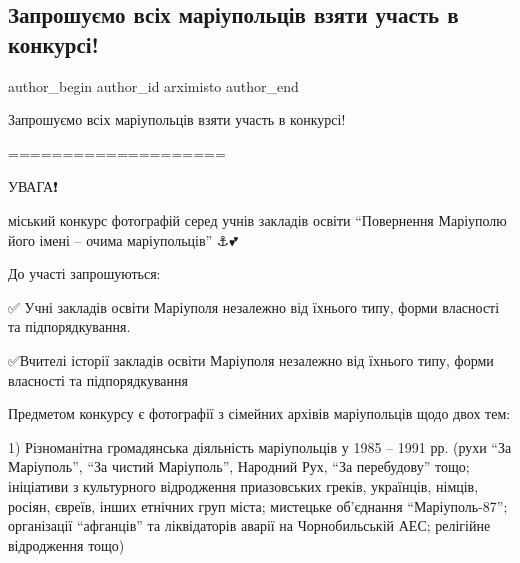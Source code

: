  
 
 
 
 

\subsection{Запрошуємо всіх маріупольців взяти участь в конкурсі!}
\label{sec:05_11_2019.fb.arximisto.1.zaproshujemo_vsih_mariupolciv_vzjaty_uchast_v_konkursi}

\ifcmt
 author_begin
   author_id arximisto
 author_end
\fi

Запрошуємо всіх маріупольців взяти участь в конкурсі! 🙂

====================

УВАГА❗️

міський конкурс фотографій серед учнів закладів освіти
\enquote{Повернення Маріуполю його імені – очима маріупольців} ⚓️💕


До участі запрошуються:

✅ Учні закладів освіти Маріуполя незалежно від їхнього типу, форми власності та підпорядкування.

✅Вчителі історії закладів освіти Маріуполя незалежно від їхнього типу, форми власності та підпорядкування

Предметом конкурсу є фотографії з сімейних архівів маріупольців щодо двох тем:

1) Різноманітна громадянська діяльність маріупольців у 1985 – 1991 рр. (рухи
\enquote{За Маріуполь}, \enquote{За чистий Маріуполь}, Народний Рух, \enquote{За перебудову} тощо;
ініціативи з культурного відродження приазовських греків, українців, німців,
росіян, євреїв, інших етнічних груп міста; мистецьке об’єднання \enquote{Маріуполь-87};
організації \enquote{афганців} та ліквідаторів аварії на Чорнобильській АЕС; релігійне
відродження тощо)

